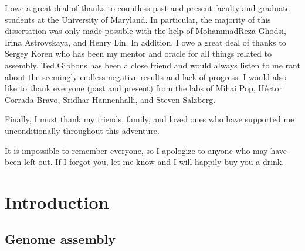 \documentclass[12pt,\mydriver]{thesis}
\begin{document}
I owe a great deal of thanks to countless past and present faculty and graduate students at the University of Maryland.
In particular, the majority of this dissertation was only made possible with the help of MohammadReza Ghodsi, Irina Astrovskaya, and Henry Lin.
In addition, I owe a great deal of thanks to Sergey Koren who has been my mentor and oracle for all things related to assembly.
Ted Gibbons has been a close friend and would always listen to me rant about the seemingly endless negative results and lack of progress.
I would also like to thank everyone (past and present) from the labs of Mihai Pop, H\'{e}ctor Corrada Bravo, Sridhar Hannenhalli, and Steven Salzberg.

Finally, I must thank my friends, family, and loved ones who have supported me unconditionally throughout this adventure.

It is impossible to remember everyone, so I apologize to anyone who may have been left out. If I forgot you, let me know and I will happily buy you a drink.
\clearpage{} 

\renewcommand{\baselinestretch}{1}
\small\normalsize
\tableofcontents \newpage
\listoftables \listoffigures \newpage

\newpage
\setlength{\parskip}{0em}
\renewcommand{\baselinestretch}{2}
\small\normalsize

\setcounter{page}{1}
\clearpage{}
\newcommand{\edit}[1]{\textcolor{black}{#1}}

\renewcommand{\thechapter}{1}

\chapter{Introduction}

\section{Genome assembly}
\end{document}
